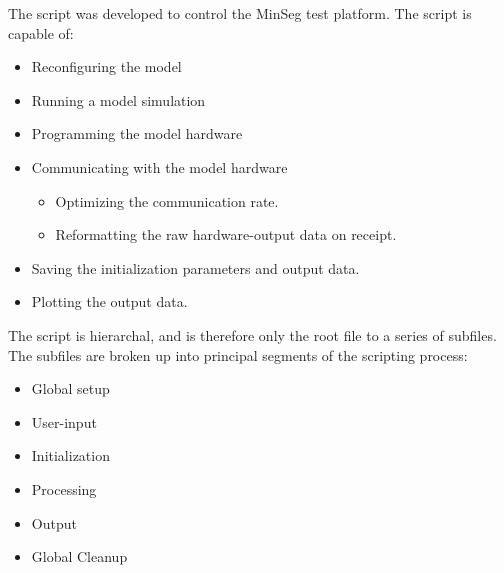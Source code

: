 \documentclass[crop=false,float=true,class=scrreprt]{standalone}
\begin{document}
The  script was developed to control the MinSeg test platform.
The script is capable of:

\begin{itemize}[leftmargin=*]

\item Reconfiguring the model

\item Running a model simulation

\item Programming the model hardware

\item Communicating with the model hardware
  \begin{itemize}[leftmargin=*, label=$\vcenter{\hbox{\tiny$\bullet$}}$]
  
  \item Optimizing the communication rate.

  \item Reformatting the raw hardware-output data on receipt.
  
  \end{itemize}

\item Saving the initialization parameters and output data.

\item Plotting the output data.

\end{itemize}

The script is hierarchal, and is therefore only the root {\fns{}} file
to a series of subfiles.
The subfiles are broken up into principal segments of the scripting process:

\begin{itemize}[leftmargin=*]

\item Global setup

\item User-input

\item Initialization

\item Processing

\item Output

\item Global Cleanup

\end{itemize}




\clearpage
\end{document}
